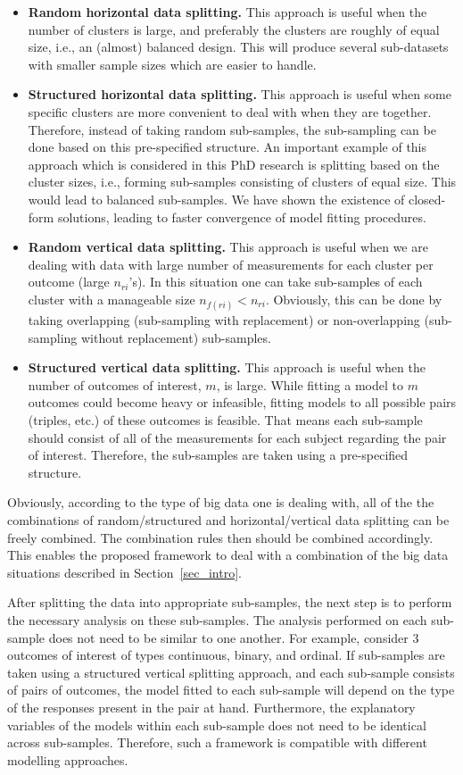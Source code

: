 \documentclass[14pt]{article}
\begin{document}
\begin{itemize}
\item \textbf{Random horizontal data splitting.} This approach is useful when the number of clusters is large, and preferably the clusters are roughly of equal size, i.e., an (almost) balanced design. This will produce several sub-datasets with smaller sample sizes which are easier to handle.
\item \textbf{Structured horizontal data splitting.} This approach is useful when some specific clusters are more convenient to deal with when they are together. Therefore, instead of taking random sub-samples, the sub-sampling can be done based on this pre-specified structure. An important example of this approach which is considered in this PhD research is splitting based on the cluster sizes, i.e., forming sub-samples consisting of clusters of equal size. This would lead to balanced sub-samples. We have shown the existence of closed-form solutions, leading to faster convergence of model fitting procedures.
\item \textbf{Random vertical data splitting.} This approach is useful when we are dealing with data with large number of measurements for each cluster per outcome (large $n_{ri}$'s). In this situation one can take sub-samples of each cluster with a manageable size $n_{f(ri)} < n_{ri}$. Obviously, this can be done by taking overlapping (sub-sampling with replacement) or non-overlapping (sub-sampling without replacement) sub-samples.
\item \textbf{Structured vertical data splitting.} This approach is useful when the number of outcomes of interest, $m$, is large. While fitting a model to $m$ outcomes could become heavy or infeasible, fitting models to all possible pairs (triples, etc.) of these outcomes is feasible. That means each sub-sample should consist of all of the measurements for each subject regarding the pair of interest. Therefore, the sub-samples are taken using a pre-specified structure.
\end{itemize}
Obviously, according to the type of big data one is dealing with, all of the the combinations of random/structured and horizontal/vertical data splitting can be freely combined. The combination rules then should be combined accordingly. This enables the proposed framework to deal with a combination of the big data situations described in Section~\ref{sec_intro}.


After splitting the data into appropriate sub-samples, the next step is to perform the necessary analysis on these sub-samples. The analysis performed on each sub-sample does not need to be similar to one another. For example, consider 3 outcomes of interest of types continuous, binary, and ordinal. If sub-samples are taken using a structured vertical splitting approach, and each sub-sample consists of pairs of outcomes, the model fitted to each sub-sample will depend on the type of the responses present in the pair at hand. Furthermore, the explanatory variables of the models within each sub-sample does not need to be identical across sub-samples. Therefore, such a framework is compatible with different modelling approaches.
\end{document}
